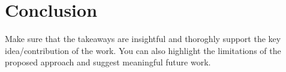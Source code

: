 \section{Conclusion}\label{sec:conclusion}
Make sure that the takeaways are insightful and thoroghly support the key idea/contribution of the work. You can also highlight the limitations of the proposed approach and suggest meaningful future work. 
